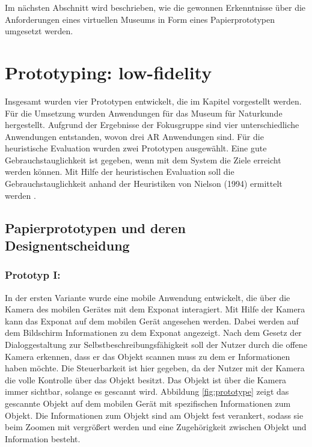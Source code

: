\documentclass[runningheads,a4paper, 12pt]{llncs}
\begin{document}





Im nächsten Abschnitt wird beschrieben, wie die gewonnen Erkenntnisse über die Anforderungen eines virtuellen Museums in Form eines Papierprototypen umgesetzt werden.

\section{Prototyping: low-fidelity} \label{chapt:low}
Insgesamt wurden vier Prototypen entwickelt, die im Kapitel  vorgestellt werden. Für die Umsetzung wurden Anwendungen für das Museum für Naturkunde hergestellt. Aufgrund der Ergebnisse der Fokusgruppe sind vier unterschiedliche Anwendungen entstanden, wovon drei AR Anwendungen sind. Für die heuristische Evaluation wurden zwei Prototypen ausgewählt. Eine gute Gebrauchstauglichkeit ist gegeben, wenn mit dem System die Ziele erreicht werden können. Mit Hilfe der heuristischen Evaluation soll die Gebrauchstauglichkeit anhand der Heuristiken von Nielson (1994) ermittelt werden \cite{Nielsen.1994}.\\
 
\subsection{Papierprototypen und deren Designentscheidung} \label{chapt:paperprotos}
 
\subsubsection{Prototyp I:} \label{chapt:paperprotoI}

In der ersten Variante wurde eine mobile Anwendung entwickelt, die über die Kamera des mobilen Gerätes mit dem Exponat interagiert. Mit Hilfe der Kamera kann das Exponat auf dem mobilen Gerät angesehen werden. Dabei werden auf dem Bildschirm  Informationen zu dem Exponat angezeigt. Nach dem Gesetz der Dialoggestaltung zur Selbstbeschreibungsfähigkeit soll der Nutzer durch die offene Kamera erkennen, dass er das Objekt scannen muss zu dem er Informationen haben möchte. Die Steuerbarkeit ist hier gegeben, da der Nutzer mit der Kamera die volle Kontrolle über das Objekt besitzt. Das Objekt ist über die Kamera immer sichtbar, solange es gescannt wird. Abbildung \ref{fig:prototype} zeigt das gescannte Objekt auf dem mobilen Gerät mit spezifischen Informationen zum Objekt. Die Informationen zum Objekt sind am Objekt fest verankert, sodass sie beim Zoomen mit vergrößert werden und eine Zugehörigkeit zwischen Objekt und Information besteht.\\
\end{document}
